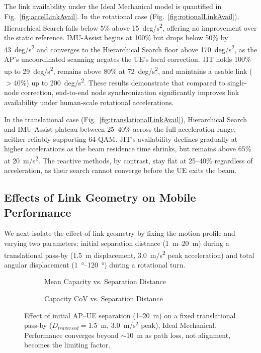 \documentclass[fleqn,10pt]{wlscirep}
\begin{document}
The link availability under the Ideal Mechanical model is quantified in Fig.~\ref{fig:accelLinkAvail}. In the rotational case (Fig.~\ref{fig:rotionalLinkAvail}), Hierarchical Search falls below 5\% above \SI{15}{deg/s^2}, offering no improvement over the static reference. IMU-Assist begins at 100\% but drops below 50\% by \SI{43}{deg/s^2} and converges to the Hierarchical Search floor above \SI{170}{deg/s^2}, as the AP's uncoordinated scanning negates the UE's local correction. JIT holds 100\% up to \SI{29}{deg/s^2}, remains above 80\% at \SI{72}{deg/s^2}, and maintains a usable link ($>$40\%) up to \SI{200}{deg/s^2}. These results demonstrate that compared to single-node correction, end-to-end node synchronization significantly improves link availability under human-scale rotational accelerations.

In the translational case (Fig.~\ref{fig:translationalLinkAvail}), Hierarchical Search and IMU-Assist plateau between 25--40\% across the full acceleration range, neither reliably supporting 64-QAM. JIT's availability declines gradually at higher accelerations as the beam residence time shrinks, but remains above 65\% at \SI{20}{m/s^2}. The reactive methods, by contrast, stay flat at 25--40\% regardless of acceleration, as their search cannot converge before the UE exits the beam.



\subsection*{Effects of Link Geometry on Mobile Performance}

We next isolate the effect of link geometry by fixing the motion profile and varying two parameters: initial separation distance (\SIrange{1}{20}{m}) during a translational pass-by (\SI{1.5}{m} displacement, \SI{3.0}{m/s^2} peak acceleration) and total angular displacement (\SIrange{1}{120}{\degree}) during a rotational turn.

\begin{figure}[h!]
    \centering
    \begin{subfigure}{0.495\linewidth}
        
        \vspace{-25pt}
        \caption{Mean Capacity vs. Separation Distance}
        \label{fig:dist_rate}
    \end{subfigure}
    \hfill
    \begin{subfigure}{0.495\linewidth}
        
        \vspace{-25pt}
        \caption{Capacity CoV vs. Separation Distance}
        \label{fig:dist_cov}
    \end{subfigure}
    \caption{Effect of initial AP--UE separation (1--20~m) on a fixed translational pass-by ($D_{traversed} = 1.5$~m, $3.0$~m/s$^2$ peak), Ideal Mechanical. Performance converges beyond ${\sim}10$~m as path loss, not alignment, becomes the limiting factor.}
    \vspace{-5pt}
\end{figure} 
\end{document}
